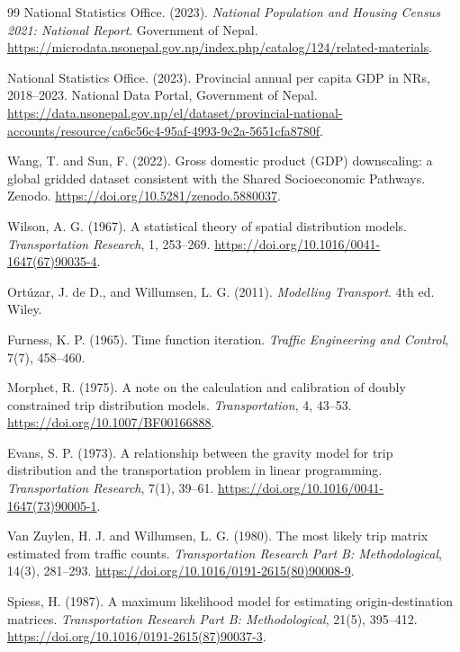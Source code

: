 \documentclass[11pt,a4paper]{article}
\begin{document}
\begin{thebibliography}{99}
National Statistics Office. (2023).
\newblock \emph{National Population and Housing Census 2021: National Report}.
\newblock Government of Nepal.
\newblock \url{https://microdata.nsonepal.gov.np/index.php/catalog/124/related-materials}.

National Statistics Office. (2023).
\newblock Provincial annual per capita GDP in NRs, 2018--2023.
\newblock National Data Portal, Government of Nepal.
\newblock \url{https://data.nsonepal.gov.np/el/dataset/provincial-national-accounts/resource/ca6c56c4-95af-4993-9c2a-5651cfa8780f}.

Wang, T. and Sun, F. (2022).
\newblock Gross domestic product (GDP) downscaling: a global gridded dataset
consistent with the Shared Socioeconomic Pathways.
\newblock Zenodo.
\newblock \url{https://doi.org/10.5281/zenodo.5880037}.

Wilson, A. G. (1967).
\newblock A statistical theory of spatial distribution models.
\newblock \emph{Transportation Research}, 1, 253--269.
\newblock \url{https://doi.org/10.1016/0041-1647(67)90035-4}.

Ortúzar, J. de D., and Willumsen, L. G. (2011).
\newblock \emph{Modelling Transport}. 4th ed.
\newblock Wiley.

Furness, K. P. (1965).
\newblock Time function iteration.
\newblock \emph{Traffic Engineering and Control}, 7(7), 458--460.

Morphet, R. (1975).
\newblock A note on the calculation and calibration of doubly constrained trip
distribution models.
\newblock \emph{Transportation}, 4, 43--53.
\newblock \url{https://doi.org/10.1007/BF00166888}.

Evans, S. P. (1973).
\newblock A relationship between the gravity model for trip distribution and
the transportation problem in linear programming.
\newblock \emph{Transportation Research}, 7(1), 39--61.
\newblock \url{https://doi.org/10.1016/0041-1647(73)90005-1}.

Van Zuylen, H. J. and Willumsen, L. G. (1980).
\newblock The most likely trip matrix estimated from traffic counts.
\newblock \emph{Transportation Research Part B: Methodological}, 14(3),
281--293.
\newblock \url{https://doi.org/10.1016/0191-2615(80)90008-9}.

Spiess, H. (1987).
\newblock A maximum likelihood model for estimating origin-destination
matrices.
\newblock \emph{Transportation Research Part B: Methodological}, 21(5),
395--412.
\newblock \url{https://doi.org/10.1016/0191-2615(87)90037-3}.


\end{thebibliography}
\end{document}
